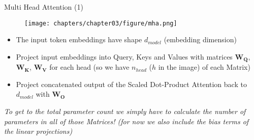 \begin{frame}{Multi Head Attention (1)}

\begin{minipage}[c]{.44\textwidth}
    \vfill
    \begin{figure}
        \centering
        \texttt{[image: chapters/chapter03/figure/mha.png]}
        \label{fig:enter-label}
    \end{figure}
    \vfill
\end{minipage}
\hfill
\begin{minipage}[c]{.54\textwidth}
    \begin{itemize}
        \item The input token embeddings have shape $d_{model}$ (embedding dimension)
        \item Project input embeddings into Query, Keys and Values with matrices $\boldsymbol{W_Q}$, $\boldsymbol{W_K}$, $\boldsymbol{W_V}$ for each head (so we have $n_{head}$ ($h$ in the image) of each Matrix)
        \item Project concatenated output of the Scaled Dot-Product Attention back to $d_{model}$ with $\boldsymbol{W_O}$
    \end{itemize}
\end{minipage}
\vfill
\textit{To get to the total parameter count we simply have to calculate the number of parameters in all of those Matrices! (for now we also include the bias terms of the linear projections)}

    
\end{frame}


